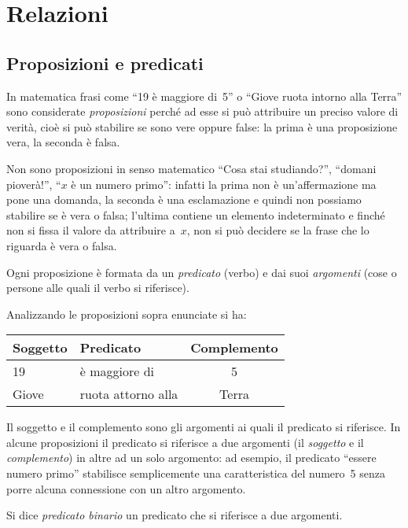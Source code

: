 
\chapter{Relazioni}
\section{Proposizioni e predicati}
In matematica frasi come ``19 è maggiore di~5'' o ``Giove ruota intorno alla Terra'' sono considerate \emph{proposizioni} perché ad esse
si può attribuire un preciso valore di verità, cioè si può stabilire se sono vere oppure false: la prima è una proposizione vera, la seconda è falsa.

Non sono proposizioni in senso matematico ``Cosa stai studiando?'', ``domani pioverà!'', ``$x$ è un numero primo'':
infatti la prima non è un'affermazione ma pone una domanda, la seconda è una esclamazione e quindi non possiamo stabilire se è vera o falsa;
l'ultima contiene un elemento indeterminato e finché non si fissa il valore da attribuire a~$x$, non si può decidere se la frase che lo riguarda è vera o falsa.

Ogni proposizione è formata da un \emph{predicato} (verbo) e dai suoi \emph{argomenti} (cose o persone alle quali il verbo si riferisce).

Analizzando le proposizioni sopra enunciate si ha:
\begin{center}
\begin{tabular}{llc}
\toprule
Soggetto & Predicato & Complemento \\
\midrule
19 & è maggiore di & 5 \\
Giove & ruota attorno alla & Terra \\
\bottomrule
\end{tabular}
\end{center}
Il soggetto e il complemento sono gli argomenti ai quali il predicato si riferisce.
In alcune proposizioni il predicato si riferisce a due argomenti (il \emph{soggetto} e il \emph{complemento})
in altre ad un solo argomento: ad esempio, il predicato ``essere numero primo'' stabilisce semplicemente una caratteristica del numero~5
senza porre alcuna connessione con un altro argomento.

\begin{definizione}\label{def:predicato_binario}
Si dice \emph{predicato binario} un predicato che si riferisce a due argomenti.
\end{definizione}

